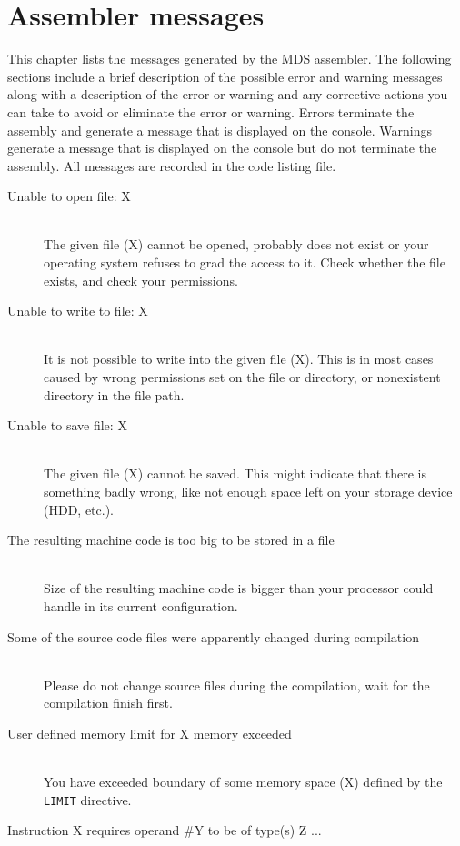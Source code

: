 \clearpage
\section{Assembler messages}
    This chapter lists the messages generated by the MDS assembler. The following sections include a brief description of the possible error and warning messages along with a description of the error or warning and any corrective actions you can take to avoid or eliminate the error or warning. Errors terminate the assembly and generate a message that is displayed on the console. Warnings generate a message that is displayed on the console but do not terminate the assembly. All messages are recorded in the code listing file.

    \begin{description}
        \item[Unable to open file: X]~\\
            The given file (X) cannot be opened, probably does not exist or your operating system refuses to grad the access to it. Check whether the file exists, and check your permissions.
        \item[Unable to write to file: X]~\\
            It is not possible to write into the given file (X). This is in most cases caused by wrong permissions set on the file or directory, or nonexistent directory in the file path.
        \item[Unable to save file: X]~\\
            The given file (X) cannot be saved. This might indicate that there is something badly wrong, like not enough space left on your storage device (HDD, etc.).
        \item[The resulting machine code is too big to be stored in a file]~\\
            Size of the resulting machine code is bigger than your processor could handle in its current configuration.
        \item[Some of the source code files were apparently changed during compilation]~\\
            Please do not change source files during the compilation, wait for the compilation finish first.
        \item[User defined memory limit for X memory exceeded]~\\
            You have exceeded boundary of some memory space (X) defined by the \texttt{LIMIT} directive.
        \item[Instruction X requires operand \#Y to be of type(s) Z ...]~\\

\end{description}
